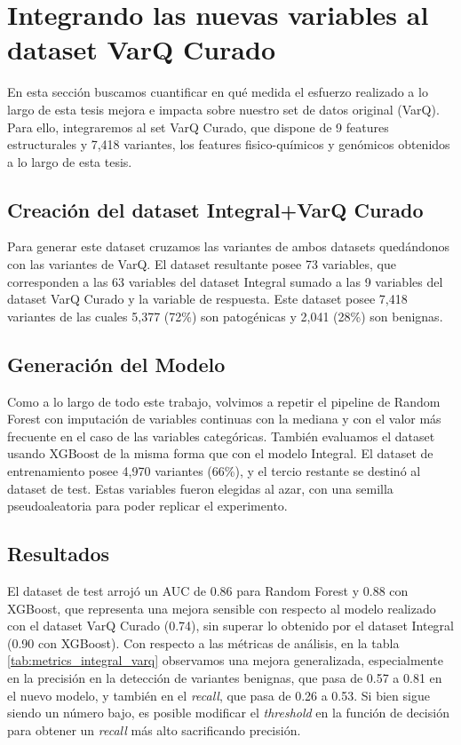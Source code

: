 \section{Integrando las nuevas variables al dataset VarQ Curado}

En esta sección buscamos cuantificar en qué medida el esfuerzo realizado a lo largo de esta tesis mejora e impacta sobre nuestro set de datos original (VarQ). Para ello, integraremos al set VarQ Curado, que dispone de 9 features estructurales y 7,418 variantes, los features fisico-químicos y genómicos obtenidos a lo largo de esta tesis.

\subsection{Creación del dataset Integral+VarQ Curado}
Para generar este dataset cruzamos las variantes de ambos datasets quedándonos con las variantes de VarQ. El dataset resultante posee 73 variables, que corresponden a las 63 variables del dataset Integral sumado a las 9 variables del dataset VarQ Curado y la variable de respuesta. Este dataset posee 7,418 variantes de las cuales 5,377 (72\%) son patogénicas y 2,041 (28\%) son benignas. 

\subsection{Generación del Modelo}
Como a lo largo de todo este trabajo, volvimos a repetir el pipeline de Random Forest con imputación de variables continuas con la mediana y con el valor más frecuente en el caso de las variables categóricas. También evaluamos el dataset usando XGBoost de la misma forma que con el modelo Integral. El dataset de entrenamiento posee 4,970 variantes (66\%), y el tercio restante se destinó al dataset de test. Estas variables fueron elegidas al azar, con una semilla pseudoaleatoria para poder replicar el experimento.  

\subsection{Resultados}
El dataset de test arrojó un AUC de 0.86 para Random Forest y 0.88 con XGBoost, que representa una mejora sensible con respecto al modelo realizado con el dataset VarQ Curado (0.74), sin superar lo obtenido por el dataset Integral (0.90 con XGBoost). Con respecto a las métricas de análisis, en la tabla \ref{tab:metrics_integral_varq} observamos una mejora generalizada, especialmente en la precisión en la detección de variantes benignas, que pasa de 0.57 a 0.81 en el nuevo modelo, y también en el \textit{recall}, que pasa de 0.26 a 0.53. Si bien sigue siendo un número bajo, es posible modificar el \textit{threshold} en la función de decisión para obtener un \textit{recall} más alto sacrificando precisión. 

